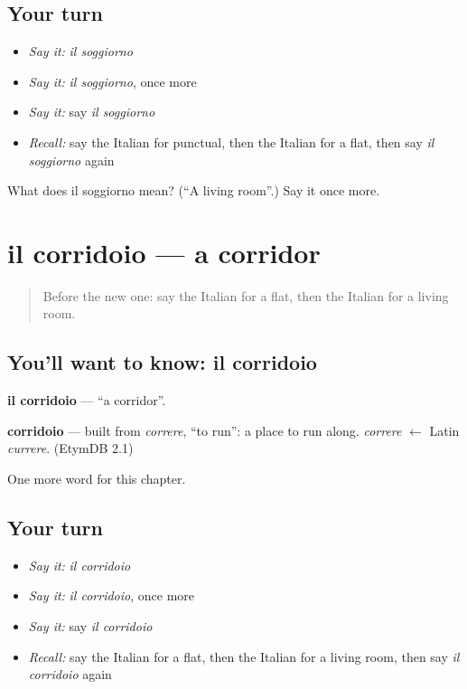 \subsection*{Your turn}
\begin{itemize}
\raggedright
  \item \emph{Say it:} \emph{il soggiorno}
  \item \emph{Say it:} \emph{il soggiorno}, once more
  \item \emph{Say it:} say \emph{il soggiorno}
  \item \emph{Recall:} say the Italian for punctual, then the Italian for a flat, then say \emph{il soggiorno} again
\end{itemize}

\begin{tcolorbox}[breakable,colback=teal!4,colframe=teal!35!black,title={Before you move on}]
What does il soggiorno mean? (\textquotedblleft{}A living room\textquotedblright{}.) Say it once more.
\end{tcolorbox}
\section[il corridoio]{il corridoio — a corridor}

\label{lesson:IT-C159-corridoio}



\begin{quote}
Before the new one: say the Italian for a flat, then the Italian for a living room.
\end{quote}

\subsection*{You'll want to know: il corridoio}
\textbf{il corridoio} — \textquotedblleft{}a corridor\textquotedblright{}.

\begin{cousinweb}
\textbf{corridoio} — built from \emph{correre}, \textquotedblleft{}to run\textquotedblright{}: a place to run along. \emph{correre} $\leftarrow$ Latin \emph{currere}. (EtymDB 2.1)
\end{cousinweb}

\begin{grammarlens}[title={What you've built}]
One more word for this chapter.
\end{grammarlens}

\subsection*{Your turn}
\begin{itemize}
\raggedright
  \item \emph{Say it:} \emph{il corridoio}
  \item \emph{Say it:} \emph{il corridoio}, once more
  \item \emph{Say it:} say \emph{il corridoio}
  \item \emph{Recall:} say the Italian for a flat, then the Italian for a living room, then say \emph{il corridoio} again
\end{itemize}

